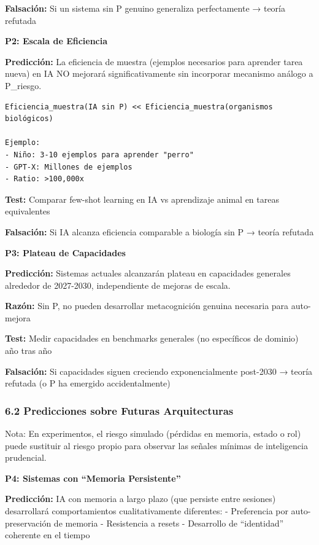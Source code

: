 \textbf{Falsación:} Si un sistema sin P genuino generaliza perfectamente
→ teoría refutada

\textbf{P2: Escala de Eficiencia}

\textbf{Predicción:} La eficiencia de muestra (ejemplos necesarios para
aprender tarea nueva) en IA NO mejorará significativamente sin
incorporar mecanismo análogo a P\_riesgo.

\begin{verbatim}
Eficiencia_muestra(IA sin P) << Eficiencia_muestra(organismos biológicos)

Ejemplo:
- Niño: 3-10 ejemplos para aprender "perro"
- GPT-X: Millones de ejemplos
- Ratio: >100,000x
\end{verbatim}

\textbf{Test:} Comparar few-shot learning en IA vs aprendizaje animal en
tareas equivalentes

\textbf{Falsación:} Si IA alcanza eficiencia comparable a biología sin P
→ teoría refutada

\textbf{P3: Plateau de Capacidades}

\textbf{Predicción:} Sistemas actuales alcanzarán plateau en capacidades
generales alrededor de 2027-2030, independiente de mejoras de escala.

\textbf{Razón:} Sin P, no pueden desarrollar metacognición genuina
necesaria para auto-mejora

\textbf{Test:} Medir capacidades en benchmarks generales (no específicos
de dominio) año tras año

\textbf{Falsación:} Si capacidades siguen creciendo exponencialmente
post-2030 → teoría refutada (o P ha emergido accidentalmente)

\subsubsection{6.2 Predicciones sobre Futuras
Arquitecturas}\label{predicciones-sobre-futuras-arquitecturas}

Nota: En experimentos, el riesgo simulado (pérdidas en memoria, estado o
rol) puede sustituir al riesgo propio para observar las señales mínimas
de inteligencia prudencial.

\textbf{P4: Sistemas con ``Memoria Persistente''}

\textbf{Predicción:} IA con memoria a largo plazo (que persiste entre
sesiones) desarrollará comportamientos cualitativamente diferentes: -
Preferencia por auto-preservación de memoria - Resistencia a resets -
Desarrollo de ``identidad'' coherente en el tiempo

